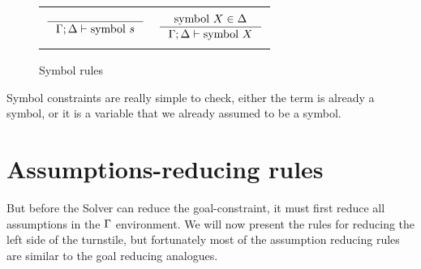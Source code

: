 \documentclass[english, mgr]{iithesis}
\newcommand{\solverRule}{\vdash}
\begin{document}
\begin{figure}[htbp]
    \centering
    \begin{tabularx}{\textwidth}{|CC|}
      \hline & \\ $
      \inference{
      }{
        \cEnv ; \icEnv \solverRule \csymb \symb
      }
      $ & $
      \inference{
        \csymb \termv \in \icEnv
      }{
        \cEnv ; \icEnv \solverRule \csymb \termv
      }
      $ \\ & \\ \hline
      \end{tabularx}
  \caption{Symbol rules}
  \label{fig:symbol-rules}
\end{figure}
Symbol constraints are really simple to check, either the term is already
a symbol, or it is a variable that we already assumed to be a symbol.

\section{Assumptions-reducing rules}
But before the Solver can reduce the goal-constraint, it must first reduce all assumptions in the $\Gamma$ environment.
We will now present the rules for reducing the left side of the turnstile,
but fortunately most of the assumption reducing rules are similar to the goal reducing analogues.
\end{document}

